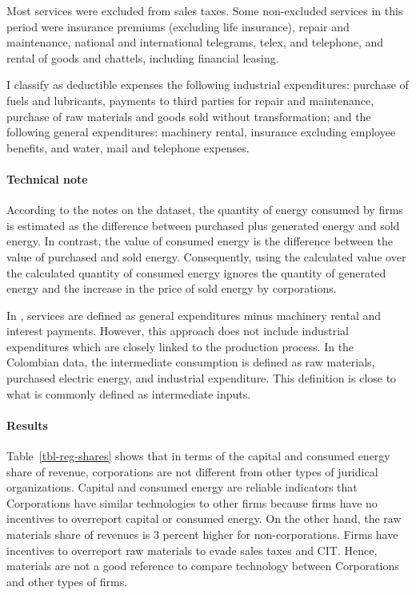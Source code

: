 \documentclass[
  12pt]{article}
\let\oldparagraph\paragraph
\renewcommand{\paragraph}[1]{\oldparagraph{#1}\mbox{}}
\theoremstyle{definition}
\theoremstyle{remark}
\begin{document}
Most services were excluded from sales taxes. Some non-excluded services
in this period were insurance premiums (excluding life insurance),
repair and maintenance, national and international telegrams, telex, and
telephone, and rental of goods and chattels, including financial
leasing.

I classify as deductible expenses the following industrial expenditures:
purchase of fuels and lubricants, payments to third parties for repair
and maintenance, purchase of raw materials and goods sold without
transformation; and the following general expenditures: machinery
rental, insurance excluding employee benefits, and water, mail and
telephone expenses.

\paragraph{Technical note}\label{technical-note}

According to the notes on the dataset, the quantity of energy consumed
by firms is estimated as the difference between purchased plus generated
energy and sold energy. In contrast, the value of consumed energy is the
difference between the value of purchased and sold energy. Consequently,
using the calculated value over the calculated quantity of consumed
energy ignores the quantity of generated energy and the increase in the
price of sold energy by corporations.

In \citet{Gandhi2020}, services are defined as general expenditures
minus machinery rental and interest payments. However, this approach
does not include industrial expenditures which are closely linked to the
production process. In the Colombian data, the intermediate consumption
is defined as raw materials, purchased electric energy, and industrial
expenditure. This definition is close to what is commonly defined as
intermediate inputs.

\paragraph{Results}\label{results}

Table~\ref{tbl-reg-shares} shows that in terms of the capital and
consumed energy share of revenue, corporations are not different from
other types of juridical organizations. Capital and consumed energy are
reliable indicators that Corporations have similar technologies to other
firms because firms have no incentives to overreport capital or consumed
energy. On the other hand, the raw materials share of revenues is 3
percent higher for non-corporations. Firms have incentives to overreport
raw materials to evade sales taxes and CIT. Hence, materials are not a
good reference to compare technology between Corporations and other
types of firms.
\end{document}
